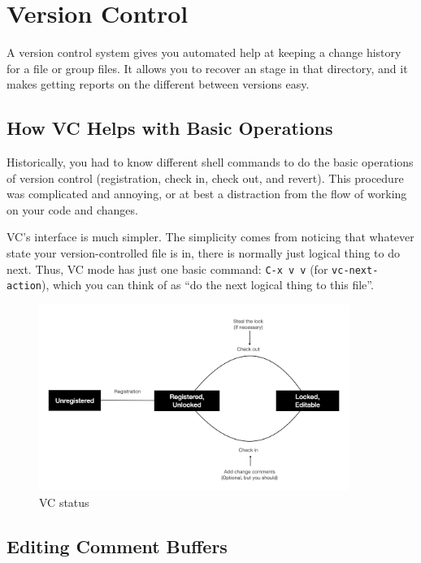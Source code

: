 
\chapter{Version Control}

A version control system gives you automated help at keeping a change history for a file or group files.
It allows you to recover an stage in that directory, and it makes getting reports on the different between versions easy.

\section{How VC Helps with Basic Operations}

Historically, you had to know  different shell commands to do the basic operations of version control (registration, check in, check out, and revert).
This procedure was complicated and annoying, or at best a distraction from the flow of working on your code and changes.

VC's interface is much simpler.
The simplicity comes from noticing that whatever state your version-controlled file is in, there is normally just  logical thing to do next. 
Thus, VC mode has just one basic command: \verb|C-x v v| (for \verb|vc-next-action|), which you can think of as ``do the next logical thing to this file''.

\begin{figure}[H]
  \centering
  \includegraphics[width=0.9\textwidth]{vc.png}
  \caption{VC status}
\end{figure}

\section{Editing Comment Buffers}


